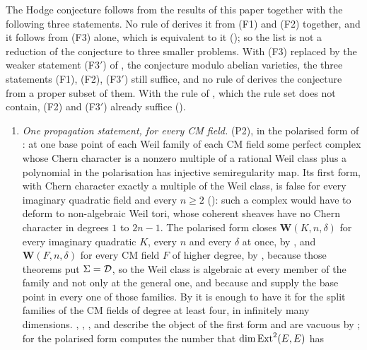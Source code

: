 \begin{corollary}\label{cor:fourremain}
The Hodge conjecture follows from the results of this paper together with the
following three statements. No rule of  derives it from
(F1) and (F2) together, and it follows from (F3) alone, which is equivalent
to it
(); so the list is not a reduction of the conjecture to
three smaller problems. With (F3) replaced by the weaker statement
\textup{(F3$'$)} of , the conjecture modulo abelian
varieties, the three statements (F1), (F2), \textup{(F3$'$)} still suffice,
and no rule of  derives the conjecture from a proper
subset of them. With the rule of , which the rule set does
not contain, (F2) and \textup{(F3$'$)} already suffice ().
\begin{enumerate}[label=\textup{(F\arabic*)},leftmargin=3.0em,itemsep=4pt]
\item \emph{One propagation statement, for every CM field.} \textup{(P2)},
  in the polarised form of : at one base point of each
  Weil family of each CM field some perfect complex whose Chern character is
  a nonzero multiple of a rational Weil class plus a polynomial in the
  polarisation has injective semiregularity map. Its first form, with Chern
  character exactly a multiple of the Weil class, is false for every
  imaginary quadratic field and every $n\ge2$ (): such a
  complex would have to deform to non-algebraic Weil tori, whose coherent
  sheaves have no Chern character in degrees $1$ to $2n-1$. The polarised form
  closes
  $\mathbf{W}(K,n,\delta)$
  for every imaginary quadratic $K$, every $n$ and every $\delta$ at once, by
  , and
  $\mathbf{W}(F,n,\delta)$ for every CM field $F$ of higher degree, by
  , because those theorems put $\Sigma=\mathcal{D}$, so the
  Weil class is algebraic at every member of the family and not only at the
  general one, and because  and 
  supply the base point in every one of those families. By
   it is enough to have it for the split families of the
  CM fields of degree at least four, in infinitely many dimensions.
  , , ,
   and  describe the object of the
  first form and are vacuous by ; for the polarised form
   computes the number that $\dim\operatorname{Ext}^{2}(E,E)$ has

\end{enumerate}
\end{corollary}
